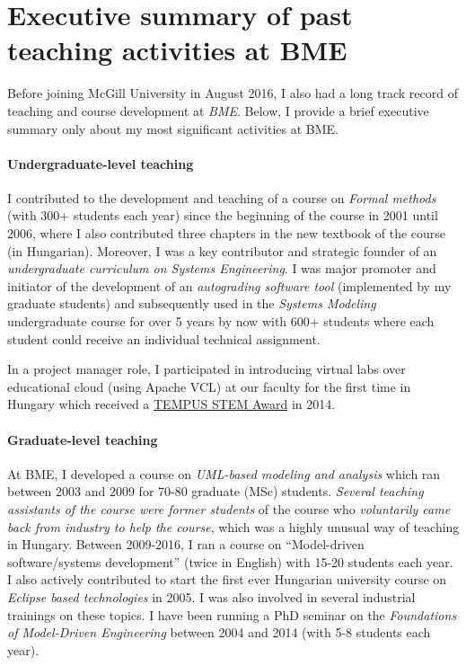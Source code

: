 \documentclass[a4paper,11pt]{article}
\begin{document}
\section{Executive summary of past teaching activities at BME}

Before joining McGill University in August 2016, I also had a long track record of teaching and course development at \emph{BME}. Below, I provide a brief executive summary only about my most significant activities at BME. 

\paragraph{Undergraduate-level teaching}
I contributed to the development and teaching of a course on \emph{Formal methods} (with 300+ students each year) since the beginning of the course in 2001 until 2006, where I also contributed three chapters in the new textbook of the course (in Hungarian).  Moreover, I was a key contributor and strategic founder of an \emph{undergraduate curriculum on Systems Engineering}.  I was major promoter and initiator of the development of an \emph{autograding software tool} (implemented by my graduate students) and subsequently used in the \emph{Systems Modeling} undergraduate course for over 5 years by now with 600+ students where each student could receive an individual technical assignment. 

In a project manager role, I participated in introducing virtual labs over educational cloud (using Apache VCL) at our faculty for the first time in Hungary which received a \href{https://inf.mit.bme.hu/en/news/2014/02/tempus-stem-call-apache-vcl-based-labs-won-prize}{TEMPUS STEM Award} in 2014. 

\paragraph{Graduate-level teaching}
At BME, I developed a course on \emph{UML-based modeling and analysis} which ran between 2003 and 2009 for 70-80 graduate (MSc) students. \emph{Several teaching assistants of the course were former students} of the course who \emph{voluntarily came back from industry to help the course}, which was a highly unusual way of teaching in Hungary. Between 2009-2016, I ran a course on “Model-driven software/systems development” (twice in English) with 15-20 students each year. I also actively contributed to start the first ever Hungarian university course on \emph{Eclipse based technologies} in 2005. I was also involved in several industrial trainings on these topics. I have been running a PhD seminar on the \emph{Foundations of Model-Driven Engineering} between 2004 and 2014 (with 5-8 students each year). 
\end{document}
